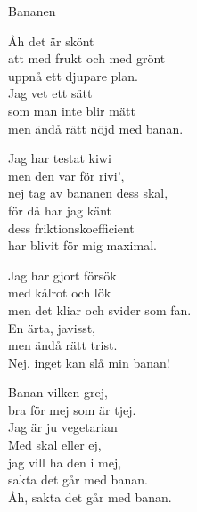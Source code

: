 \begin{song}{Bananen}

	
	Åh det är skönt\\
	att med frukt och med grönt\\
	uppnå ett djupare plan.\\
	Jag vet ett sätt\\
	som man inte blir mätt\\
	men ändå rätt nöjd med banan.

	Jag har testat kiwi\\
	men den var för rivi',\\
	nej tag av bananen dess skal,\\
	för då har jag känt\\
	dess friktionskoefficient\\
	har blivit för mig maximal.

	Jag har gjort försök\\
	med kålrot och lök\\
	men det kliar och svider som fan.\\
	En ärta, javisst,\\
	men ändå rätt trist.\\
	Nej, inget kan slå min banan!

	Banan vilken grej,\\
	bra för mej som är tjej.\\
	Jag är ju vegetarian\\
	Med skal eller ej, \\
	jag vill ha den i mej,\\
	sakta det går med banan.\\
	Åh, sakta det går med banan.
	
\end{song}
